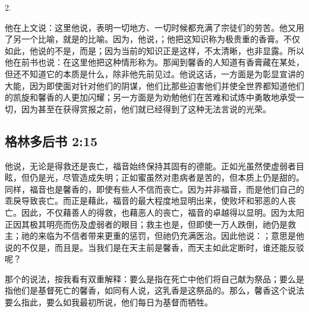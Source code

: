 2.  \par

他在上文说：这里他说，表明一切地方、一切时候都充满了宗徒们的劳苦。他又用了另一个比喻，就是的比喻。因为，他说，；他把这知识称为极贵重的香膏。不仅如此，他说的不是，而是；因为当前的知识正是这样，不太清晰，也非显露。所以他在前书也说：在这里他把这种情形称为。那闻到馨香的人知道有香膏藏在某处，但还不知道它的本质是什么，除非他先前见过。他说这话，一方面是为彰显宣讲的大能，因为即使面对针对他们的阴谋，他们比那些迫害他们并使全世界都知道他们的凯旋和馨香的人更加闪耀；另一方面是为劝勉他们在苦难和试炼中勇敢地承受一切，因为甚至在获得赏报之前，他们就已经得到了这种无法言说的光荣。\par


\subsection{格林多后书 2:15}

\par

他说，无论是得救还是丧亡，福音始终保持其固有的德能。正如光虽然使虚弱者目眩，但仍是光，尽管造成失明；正如蜜虽然对患病者是苦的，但本质上仍是甜的。同样，福音也是馨香的，即使有些人不信而丧亡。因为并非福音，而是他们自己的乖戾导致丧亡。而正是藉此，福音的最大程度地显明出来，使败坏和邪恶的人丧亡。因此，不仅藉善人的得救，也藉恶人的丧亡，福音的卓越得以显明。因为太阳正因其极其明亮而伤及虚弱者的眼目；救主也是，但即使一万人跌倒，祂仍是救主；祂的来临为不信者带来更重的惩罚，但祂仍充满医治。因此他说：；意思是他说的不仅是，而且是。当我们是在天主前是馨香，而天主如此定断时，谁还能反驳呢？\par

那个的说法，按我看有双重解释：要么是指在死亡中他们将自己献为祭品；要么是指他们是基督死亡的馨香，如同有人说，这乳香是这祭品的。那么，馨香这个说法要么指此，要么如我最初所说，他们每日为基督而牺牲。\par

